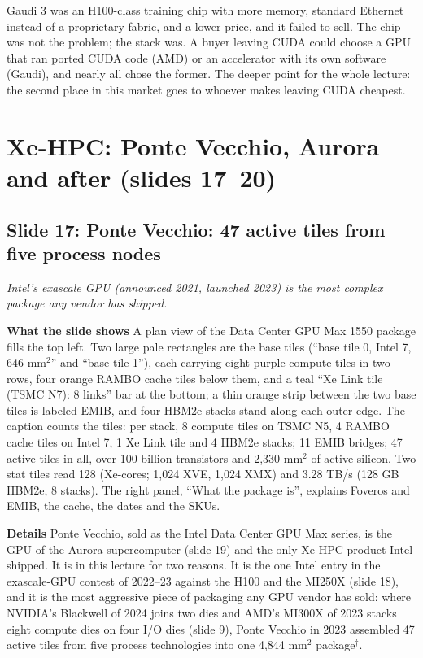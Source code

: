 \documentclass[11pt,letterpaper]{article}
\newcommand{\setstage}[1]{\colorlet{stagec}{#1}}
\newcommand{\slide}[3]{%
  \subsection[Slide #1: #2]{Slide #1: #2}%
  {\color{muted}\itshape #3\par}\medskip}
\newcommand{\para}[1]{\medskip\noindent\textbf{#1}\quad}
\newenvironment{intuition}{\begin{tcolorbox}[intuitionbox]}{\end{tcolorbox}}
\begin{document}
\begin{intuition}
Gaudi 3 was an H100-class training chip with more memory, standard Ethernet instead of a proprietary fabric, and a lower price, and it failed to sell. The chip was not the problem; the stack was. A buyer leaving CUDA could choose a GPU that ran ported CUDA code (AMD) or an accelerator with its own software (Gaudi), and nearly all chose the former. The deeper point for the whole lecture: the second place in this market goes to whoever makes leaving CUDA cheapest.
\end{intuition}

\setstage{mlp}
\section{Xe-HPC: Ponte Vecchio, Aurora and after (slides 17--20)}

\slide{17}{Ponte Vecchio: 47 active tiles from five process nodes}{Intel's exascale GPU (announced 2021, launched 2023) is the most complex package any vendor has shipped.}

\para{What the slide shows} A plan view of the Data Center GPU Max 1550 package fills the top left. Two large pale rectangles are the base tiles (``base tile 0, Intel 7, 646 mm$^2$'' and ``base tile 1''), each carrying eight purple compute tiles in two rows, four orange RAMBO cache tiles below them, and a teal ``Xe Link tile (TSMC N7): 8 links'' bar at the bottom; a thin orange strip between the two base tiles is labeled EMIB, and four HBM2e stacks stand along each outer edge. The caption counts the tiles: per stack, 8 compute tiles on TSMC N5, 4 RAMBO cache tiles on Intel 7, 1 Xe Link tile and 4 HBM2e stacks; 11 EMIB bridges; 47 active tiles in all, over 100 billion transistors and 2{,}330 mm$^2$ of active silicon. Two stat tiles read 128 (Xe-cores; 1{,}024 XVE, 1{,}024 XMX) and 3.28 TB/s (128 GB HBM2e, 8 stacks). The right panel, ``What the package is'', explains Foveros and EMIB, the cache, the dates and the SKUs.

\para{Details} Ponte Vecchio, sold as the Intel Data Center GPU Max series, is the GPU of the Aurora supercomputer (slide 19) and the only Xe-HPC product Intel shipped. It is in this lecture for two reasons. It is the one Intel entry in the exascale-GPU contest of 2022--23 against the H100 and the MI250X (slide 18), and it is the most aggressive piece of packaging any GPU vendor has sold: where NVIDIA's Blackwell of 2024 joins two dies and AMD's MI300X of 2023 stacks eight compute dies on four I/O dies (slide 9), Ponte Vecchio in 2023 assembled 47 active tiles from five process technologies into one 4{,}844 mm$^2$ package$^\dagger$.
\end{document}
